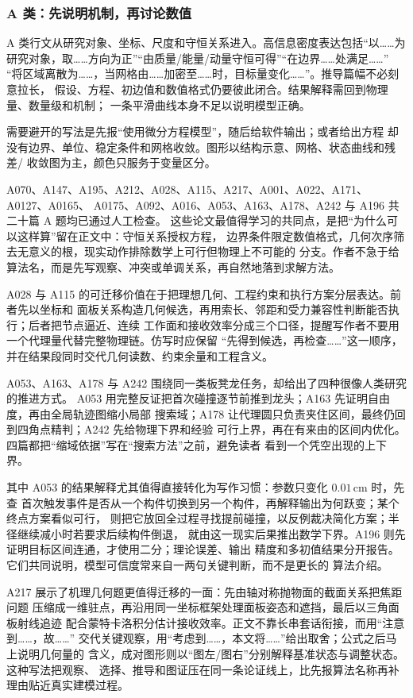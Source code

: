 \subsubsection{A 类：先说明机制，再讨论数值}

A 类行文从研究对象、坐标、尺度和守恒关系进入。高信息密度表达包括“以……为
研究对象，取……方向为正”“由质量/能量/动量守恒可得”“在边界……处满足……”
“将区域离散为……，当网格由……加密至……时，目标量变化……”。推导篇幅不必刻意拉长，
假设、方程、初边值和数值格式仍要彼此闭合。结果解释需回到物理量、数量级和机制；
一条平滑曲线本身不足以说明模型正确。

需要避开的写法是先报“使用微分方程模型”，随后给软件输出；或者给出方程
却没有边界、单位、稳定条件和网格收敛。图形以结构示意、网格、状态曲线和残差/
收敛图为主，颜色只服务于变量区分。

A070、A147、A195、A212、A028、A115、A217、A001、A022、A171、A0127、A0165、
A0175、A092、A016、A053、A163、A178、A242 与 A196 共二十篇 A 题均已通过人工检查。
这些论文最值得学习的共同点，是把“为什么可以这样算”留在正文中：守恒关系授权方程，
边界条件限定数值格式，几何次序筛去无意义的根，现实动作排除数学上可行但物理上不可能的
分支。作者不急于给算法名，而是先写观察、冲突或单调关系，再自然地落到求解方法。

A028 与 A115 的可迁移价值在于把理想几何、工程约束和执行方案分层表达。前者先以坐标和
面板关系构造几何候选，再用索长、邻距和受力兼容性判断能否执行；后者把节点逼近、连续
工作面和接收效率分成三个口径，提醒写作者不要用一个代理量代替完整物理链。仿写时应保留
“先得到候选，再检查……”这一顺序，并在结果段同时交代几何读数、约束余量和工程含义。

A053、A163、A178 与 A242 围绕同一类板凳龙任务，却给出了四种很像人类研究的推进方式。
A053 用完整反证把首次碰撞逐节前推到龙头；A163 先证明自由度，再由全局轨迹图缩小局部
搜索域；A178 让代理圆只负责夹住区间，最终仍回到四角点精判；A242 先给物理下界和经验
可行上界，再在有来由的区间内优化。四篇都把“缩域依据”写在“搜索方法”之前，避免读者
看到一个凭空出现的上下界。

其中 A053 的结果解释尤其值得直接转化为写作习惯：参数只变化 $0.01\,\mathrm{cm}$ 时，先查
首次触发事件是否从一个构件切换到另一个构件，再解释输出为何跃变；某个终点方案看似可行，
则把它放回全过程寻找提前碰撞，以反例裁决简化方案；半径继续减小时若要求后续构件倒退，
就由这一现实后果推出数学下界。A196 则先证明目标区间连通，才使用二分；理论误差、输出
精度和多初值结果分开报告。它们共同说明，模型可信度常来自一两句关键判断，而不是更长的
算法介绍。

A217 展示了机理几何题更值得迁移的一面：先由轴对称抛物面的截面关系把焦距问题
压缩成一维驻点，再沿用同一坐标框架处理面板姿态和遮挡，最后以三角面板射线追迹
配合蒙特卡洛积分估计接收效率。正文不靠长串套话衔接，而用“注意到……，故……”
交代关键观察，用“考虑到……，本文将……”给出取舍；公式之后马上说明几何量的
含义，成对图形则以“图左/图右”分别解释基准状态与调整状态。这种写法把观察、
选择、推导和图证压在同一条论证线上，比先报算法名称再补理由贴近真实建模过程。

